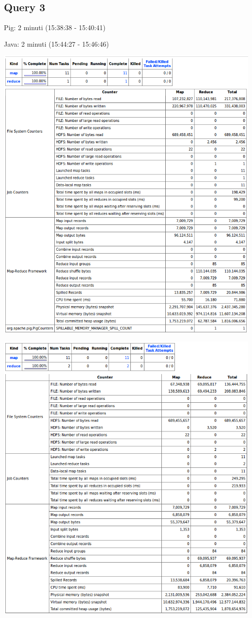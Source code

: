 \documentclass[11pt]{article} %
\begin{document}
\subsection{Query 3}
Pig: 2 minuti	 (15:38:38 - 15:40:41)

Java: 2 minuti	(15:44:27 - 15:46:46)

\includegraphics[scale=0.8]{pig3.png}

\includegraphics[scale=0.8]{java3.png}
\end{document}
